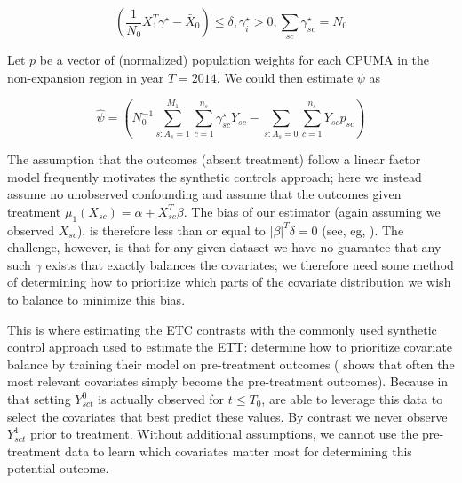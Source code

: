 \documentclass[12pt]{article}
\begin{document}
$$
(\frac{1}{N_0}X_1^T\gamma^\star - \bar{X}_0) \le \delta, \gamma_i^\star > 0, \sum_{sc} \gamma_{sc}^\star = N_0
$$

Let $p$ be a vector of (normalized) population weights for each CPUMA in the non-expansion region in year $T = 2014$. We could then estimate $\psi$ as

$$
\hat{\psi} = (N_0^{-1}\sum_{s: A_s = 1}^{M_1}\sum_{c = 1}^{n_s}\gamma_{sc}^\star Y_{sc} - \sum_{s: A_s = 0}\sum_{c = 1}^{n_s}Y_{sc}p_{sc})
$$

The assumption that the outcomes (absent treatment) follow a linear factor model frequently motivates the synthetic controls approach; here we instead assume no unobserved confounding and assume that the outcomes given treatment $\mu_1(X_{sc}) = \alpha + X_{sc}^T\beta$. The bias of our estimator (again assuming we observed $X_{sc}$), is therefore less than or equal to $\lvert\beta\rvert^T\delta = 0$ (see, eg, \cite{zubizarreta2015stable}). The challenge, however, is that for any given dataset we have no guarantee that any such $\gamma$ exists that exactly balances the covariates; we therefore need some method of determining how to prioritize which parts of the covariate distribution we wish to balance to minimize this bias.

This is where estimating the ETC contrasts with the commonly used synthetic control approach used to estimate the ETT: \cite{abadie2010synthetic} determine how to prioritize covariate balance by training their model on pre-treatment outcomes (\cite{kaul2015synthetic} shows that often the most relevant covariates simply become the pre-treatment outcomes). Because in that setting $Y^0_{sct}$ is actually observed for $t \le T_0$, \cite{abadie2010synthetic} are able to leverage this data to select the covariates that best predict these values. By contrast we never observe $Y^1_{sct}$ prior to treatment. Without additional assumptions, we cannot use the pre-treatment data to learn which covariates matter most for determining this potential outcome.
\end{document}
